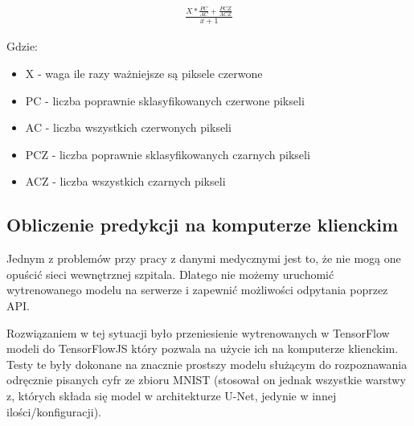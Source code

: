 \documentclass{article}
\begin{document}
\begin{align}
    \frac{X*\frac{PC}{AC} + \frac{PCZ}{ACZ}}{x+1}
\end{align}

Gdzie:
\begin{itemize}
    \item X - waga ile razy ważniejsze są piksele czerwone
    \item PC - liczba poprawnie sklasyfikowanych czerwone pikseli
    \item AC - liczba wszystkich czerwonych pikseli
    \item PCZ - liczba poprawnie sklasyfikowanych czarnych pikseli
    \item ACZ - liczba wszystkich czarnych pikseli
\end{itemize}

\subsection{Obliczenie predykcji na komputerze klienckim}
Jednym z problemów przy pracy z danymi medycznymi jest to, że nie mogą one opuścić sieci wewnętrznej szpitala.
Dlatego nie możemy uruchomić wytrenowanego modelu na serwerze i zapewnić możliwości odpytania poprzez API.

Rozwiązaniem w tej sytuacji było przeniesienie wytrenowanych w TensorFlow modeli do TensorFlowJS który pozwala na użycie ich na komputerze klienckim.
Testy te były dokonane na znacznie prostszy modelu służącym do rozpoznawania odręcznie pisanych cyfr ze zbioru MNIST (stosował on jednak wszystkie warstwy z, których składa się model w architekturze U-Net, jedynie w innej ilości/konfiguracji).
\end{document}
